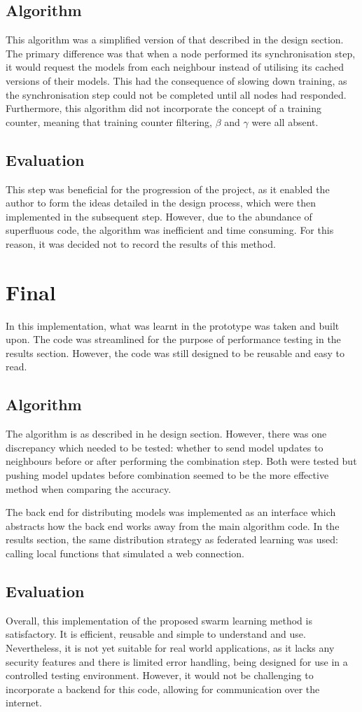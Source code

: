 \subsection{Algorithm}
This algorithm was a simplified version of that described in the design section. The primary difference was that when a node performed its synchronisation step, it would request the models from each neighbour instead of utilising its cached versions of their models. This had the consequence of slowing down training, as the synchronisation step could not be completed until all nodes had responded. Furthermore, this algorithm did not incorporate the concept of a training counter, meaning that training counter filtering, $\beta$ and $\gamma$ were all absent.

\subsection{Evaluation}
This step was beneficial for the progression of the project, as it enabled the author to form the ideas detailed in the design process, which were then implemented in the subsequent step. However, due to the abundance of superfluous code, the algorithm was inefficient and time consuming. For this reason, it was decided not to record the results of this method.

\section{Final}
In this implementation, what was learnt in the prototype was taken and built upon. The code was streamlined for the purpose of performance testing in the results section. However, the code was still designed to be reusable and easy to read.

\subsection{Algorithm}
The algorithm is as described in he design section. However, there was one discrepancy which needed to be tested: whether to send model updates to neighbours before or after performing the combination step. Both were tested but pushing model updates before combination seemed to be the more effective method when comparing the accuracy.

The back end for distributing models was implemented as an interface which abstracts how the back end works away from the main algorithm code. In the results section, the same distribution strategy as federated learning was used: calling local functions that simulated a web connection.
\subsection{Evaluation}
Overall, this implementation of the proposed swarm learning method is satisfactory. It is efficient, reusable and simple to understand and use. Nevertheless, it is not yet suitable for real world applications, as it lacks any security features and there is limited error handling, being designed for use in a controlled testing environment. However, it would not be challenging to incorporate a backend for this code, allowing for communication over the internet.